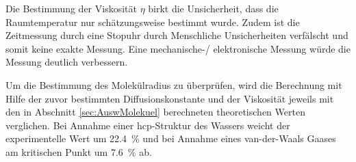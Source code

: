 Die Bestimmung der Viskosität $\eta$ birkt die Unsicherheit, dass die Raumtemperatur
nur schätzungsweise bestimmt wurde. Zudem ist die Zeitmessung durch eine Stopuhr durch
Menschliche Unsicherheiten verfälscht und somit keine exakte Messung. Eine mechanische-/
elektronische Messung würde die Messung deutlich verbessern.

Um die Bestimmung des Molekülradius zu überprüfen, wird die Berechnung mit Hilfe der zuvor
bestimmten Diffusionskonstante und der Viskosität jeweils mit den
in Abschnitt \ref{sec:AuswMolekuel} berechneten theoretischen Werten verglichen.
Bei Annahme einer hcp-Struktur des Wassers weicht der experimentelle Wert
um \SI{22.4}{\percent} und bei Annahme eines
van-der-Waals Gaases am kritischen Punkt um \SI{7.6}{\percent} ab.
